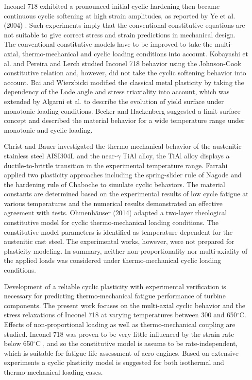 \documentclass[preprint,5p,twocolumn,11pt,sort&compress]{elsarticle}
\begin{document}
Inconel 718 exhibited a pronounced initial cyclic hardening then became continuous cyclic softening at high strain amplitudes, as reported by  Ye et al. (2004) \cite{ye2004low} . Such experiments imply that the conventional constitutive equations are not suitable to give correct stress and strain predictions in mechanical design. The conventional constitutive models have to be improved to take the multi-axial, thermo-mechanical and cyclic loading conditions into account.
Kobayashi et al. \cite{Kobayashi2008389} and Pereira and Lerch  \cite{Pereira2001715} studied  Inconel 718 behavior using the Johnson-Cook constitutive relation and, however, did not take the cyclic softening behavior into account.
Bai and Wierzbicki  \cite{Bai20081071} modified the classical metal plasticity by taking the dependency of the Lode angle and stress triaxiality into account, which was extended by Algarni et al.  \cite{Algarni2015140} to describe the evolution of yield surface under monotonic loading conditions. Becker and Hackenberg \cite{Becker2011596} suggested a limit surface concept and described the material behavior for a wide temperature range under monotonic and cyclic loading.

Christ and Bauer \cite{Christ201259} investigated the thermo-mechanical behavior of the austenitic stainless steel AISI304L and the near-$\gamma$ TiAl alloy, the TiAl alloy displays a ductile-to-brittle transition in the experimental temperature range.
Farrahi  \cite{Farrahi2014245} applied two plasticity approaches including the spring-slider rule of Nagode and the hardening rule of Chaboche to simulate cyclic behaviors.
The material constants are determined based on the experimental results of low cycle fatigue at various temperatures and
the numerical results demonstrated an effective agreement with tests.
Ohmenh\"{a}user (2014) \cite{Ohmenhauser2014631} adapted a two-layer rheological constitutive model for cyclic thermo-mechanical loading conditions.
The constitutive model parameters is identified as temperature dependent for the austenitic cast steel. The experimental works, however, were not prepared for plasticity modeling. In summary, neither non-proportionality nor multi-axiality of the applied loads was considered under thermo-mechanical cyclic loading conditions.

Development of a reliable cyclic plasticity with experimental verification is necessary for predicting thermo-mechanical fatigue performance of turbine components.
The present work focuses on the  multi-axial cyclic behavior and the stress relaxations of Inconel 718 at varying temperatures between 300 and 650$^{\circ}$C. Effects of non-proportional loading as well as thermo-mechanical coupling are studied. Inconel 718 was proven to be very little influenced by the strain rate below 650$^{\circ}$C \cite{IN718norm}, and so the constitutive model is assume to be rate-independent, which is suitable for fatigue life assessment of aero engines. Based on extensive experiments a cyclic plasticity model is suggested for both isothermal and thermo-mechanical loading cases.
\end{document}
